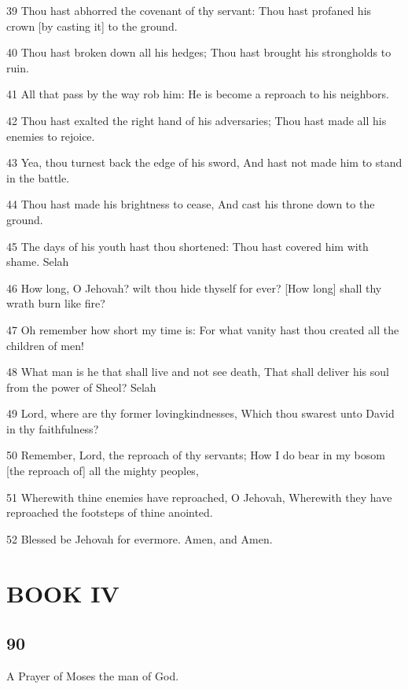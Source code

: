 \par 39 Thou hast abhorred the covenant of thy servant: Thou hast profaned his crown [by casting it] to the ground.
\par 40 Thou hast broken down all his hedges; Thou hast brought his strongholds to ruin.
\par 41 All that pass by the way rob him: He is become a reproach to his neighbors.
\par 42 Thou hast exalted the right hand of his adversaries; Thou hast made all his enemies to rejoice.
\par 43 Yea, thou turnest back the edge of his sword, And hast not made him to stand in the battle.
\par 44 Thou hast made his brightness to cease, And cast his throne down to the ground.
\par 45 The days of his youth hast thou shortened: Thou hast covered him with shame. Selah
\par 46 How long, O Jehovah? wilt thou hide thyself for ever? [How long] shall thy wrath burn like fire?
\par 47 Oh remember how short my time is: For what vanity hast thou created all the children of men!
\par 48 What man is he that shall live and not see death, That shall deliver his soul from the power of Sheol? Selah
\par 49 Lord, where are thy former lovingkindnesses, Which thou swarest unto David in thy faithfulness?
\par 50 Remember, Lord, the reproach of thy servants; How I do bear in my bosom [the reproach of] all the mighty peoples,
\par 51 Wherewith thine enemies have reproached, O Jehovah, Wherewith they have reproached the footsteps of thine anointed.
\par 52 Blessed be Jehovah for evermore. Amen, and Amen.

\part{BOOK IV}


\chapter{90}

\par A Prayer of Moses the man of God.

